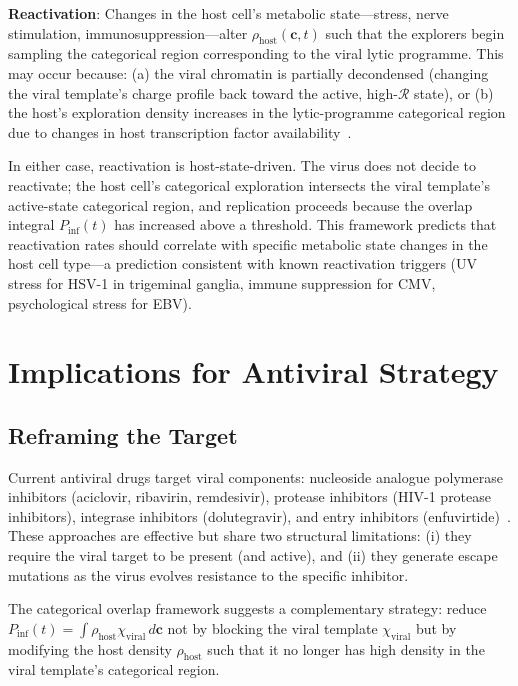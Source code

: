 \documentclass[12pt,a4paper]{article}
\theoremstyle{definition}
\theoremstyle{remark}
\newcommand{\Rcat}{\mathcal{R}}
\newcommand{\Phost}{\rho_{\mathrm{host}}}
\newcommand{\chiviral}{\chi_{\mathrm{viral}}}
\newcommand{\vv}[1]{\boldsymbol{#1}}
\begin{document}
\textbf{Reactivation}: Changes in the host cell's metabolic state---stress, nerve stimulation, immunosuppression---alter $\Phost(\vv{c}, t)$ such that the explorers begin sampling the categorical region corresponding to the viral lytic programme. This may occur because: (a) the viral chromatin is partially decondensed (changing the viral template's charge profile back toward the active, high-$\Rcat$ state), or (b) the host's exploration density increases in the lytic-programme categorical region due to changes in host transcription factor availability~\cite{Nicoll2012,Siliciano2011}.

In either case, reactivation is host-state-driven. The virus does not decide to reactivate; the host cell's categorical exploration intersects the viral template's active-state categorical region, and replication proceeds because the overlap integral $P_{\mathrm{inf}}(t)$ has increased above a threshold. This framework predicts that reactivation rates should correlate with specific metabolic state changes in the host cell type---a prediction consistent with known reactivation triggers (UV stress for HSV-1 in trigeminal ganglia, immune suppression for CMV, psychological stress for EBV).

\section{Implications for Antiviral Strategy}
\label{sec:antiviral}

\subsection{Reframing the Target}

Current antiviral drugs target viral components: nucleoside analogue polymerase inhibitors (aciclovir, ribavirin, remdesivir), protease inhibitors (HIV-1 protease inhibitors), integrase inhibitors (dolutegravir), and entry inhibitors (enfuvirtide)~\cite{Kaufmann2011}. These approaches are effective but share two structural limitations: (i) they require the viral target to be present (and active), and (ii) they generate escape mutations as the virus evolves resistance to the specific inhibitor.

The categorical overlap framework suggests a complementary strategy: reduce $P_{\mathrm{inf}}(t) = \int \Phost \chiviral\,d\vv{c}$ not by blocking the viral template $\chiviral$ but by modifying the host density $\Phost$ such that it no longer has high density in the viral template's categorical region.
\end{document}
